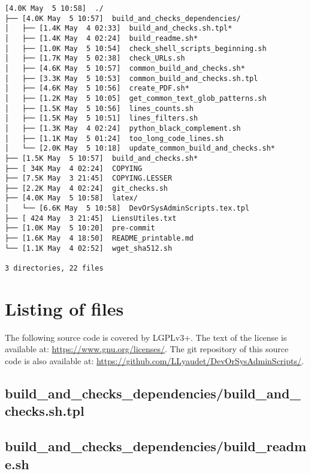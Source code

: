 \documentclass{article}
\begin{document}
\begin{verbatim}
[4.0K May  5 10:58]  ./
├── [4.0K May  5 10:57]  build_and_checks_dependencies/
│   ├── [1.4K May  4 02:33]  build_and_checks.sh.tpl*
│   ├── [1.4K May  4 02:24]  build_readme.sh*
│   ├── [1.0K May  5 10:54]  check_shell_scripts_beginning.sh
│   ├── [1.7K May  5 02:38]  check_URLs.sh
│   ├── [4.6K May  5 10:57]  common_build_and_checks.sh*
│   ├── [3.3K May  5 10:53]  common_build_and_checks.sh.tpl
│   ├── [4.6K May  5 10:56]  create_PDF.sh*
│   ├── [1.2K May  5 10:05]  get_common_text_glob_patterns.sh
│   ├── [1.5K May  5 10:56]  lines_counts.sh
│   ├── [1.5K May  5 10:51]  lines_filters.sh
│   ├── [1.3K May  4 02:24]  python_black_complement.sh
│   ├── [1.1K May  5 01:24]  too_long_code_lines.sh
│   └── [2.0K May  5 10:18]  update_common_build_and_checks.sh*
├── [1.5K May  5 10:57]  build_and_checks.sh*
├── [ 34K May  4 02:24]  COPYING
├── [7.5K May  3 21:45]  COPYING.LESSER
├── [2.2K May  4 02:24]  git_checks.sh
├── [4.0K May  5 10:58]  latex/
│   └── [6.6K May  5 10:58]  DevOrSysAdminScripts.tex.tpl
├── [ 424 May  3 21:45]  LiensUtiles.txt
├── [1.0K May  5 10:20]  pre-commit
├── [1.6K May  4 18:50]  README_printable.md
└── [1.1K May  4 02:52]  wget_sha512.sh

3 directories, 22 files
\end{verbatim}

\section{Listing of files}
\label{section:listing}

The following source code is covered by LGPLv3+.
The text of the license is available at:
\url{https://www.gnu.org/licenses/}.
The git repository of this source code is also available at:
\url{https://github.com/LLyaudet/DevOrSysAdminScripts/}.


\subsection{
  build\_and\_checks\_dependencies/build\_and\_checks.sh.tpl
}
\label{
  build_and_checks_dependencies:build_and_checksshtpl
}



\subsection{
  build\_and\_checks\_dependencies/build\_readme.sh
}
\label{
  build_and_checks_dependencies:build_readmesh
}
\end{document}
